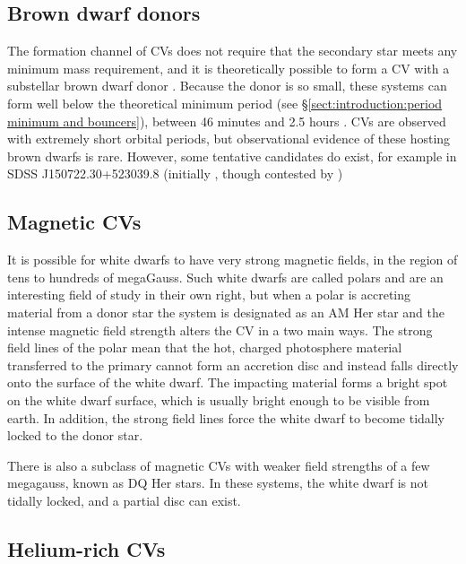 \subsection{Brown dwarf donors}
\label{sect:introduction:brown dwarf donors}

The formation channel of CVs does not require that the secondary star meets any minimum mass requirement, and it is theoretically possible to form a CV with a substellar brown dwarf donor \citep{politano2002,politano2004}. Because the donor is so small, these systems can form well below the theoretical minimum period (see \S\ref{sect:introduction:period minimum and bouncers}), between 46 minutes and 2.5 hours \citep{politano2004}. CVs are observed with extremely short orbital periods, but observational evidence of these hosting brown dwarfs is rare. However, some tentative candidates do exist, for example in SDSS J150722.30+523039.8 (initially \citealt{littlefair2007}, though contested by \citealt{uthas2011})

\subsection{Magnetic CVs}
\label{sect:introduction:magnetic CVs}

It is possible for white dwarfs to have very strong magnetic fields, in the region of tens to hundreds of megaGauss. Such white dwarfs are called polars and are an interesting field of study in their own right, but when a polar is accreting material from a donor star the system is designated as an AM Her star and the intense magnetic field strength alters the CV in a two main ways. The strong field lines of the polar mean that the hot, charged photosphere material transferred to the primary cannot form an accretion disc and instead falls directly onto the surface of the white dwarf. The impacting material forms a bright spot on the white dwarf surface, which is usually bright enough to be visible from earth. In addition, the strong field lines force the white dwarf to become tidally locked to the donor star.

There is also a subclass of magnetic CVs with weaker field strengths of a few megagauss, known as DQ Her stars. In these systems, the white dwarf is not tidally locked, and a partial disc can exist.

\subsection{Helium-rich CVs}
\label{sect:introduction:AM CVn}

